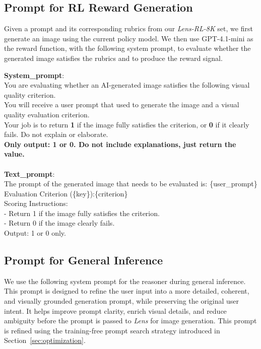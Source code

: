 \subsection{Prompt for RL Reward Generation}
\label{sec:prompt-reward}
Given a prompt and its corresponding rubrics from our \textit{Lens-RL-8K} set, we first generate an image using the current policy model. We then use GPT-4.1-mini as the reward function, with the following system prompt, to evaluate whether the generated image satisfies the rubrics and to produce the reward signal.


\begin{tcolorbox}[
  breakable,
  enhanced,
  colback=white,
  colframe=black!70,
  boxrule=0.8pt,
  arc=2pt,
  title={Prompt for RL Reward Generation},
  colbacktitle=black!75,
  coltitle=white,
  fonttitle=\bfseries,
  left=8pt,right=8pt,top=8pt,bottom=8pt
]
\footnotesize
\textbf{System\_prompt}: \\
\indent You are evaluating whether an AI-generated image satisfies the following visual quality criterion.\\
\indent You will receive a user prompt that used to generate the image and a visual quality evaluation criterion.\\
\indent Your job is to return \textbf{1} if the image fully satisfies the criterion, or \textbf{0} if it clearly fails. Do not explain or elaborate.\\
\indent \textbf{Only output: 1 or 0. Do not include explanations, just return the value.}\\
\\
\textbf{Text\_prompt}:\\
\indent The prompt of the generated image that needs to be evaluated is: \{user\_prompt\}\\
\indent Evaluation Criterion (\{key\}):\{criterion\}\\
\indent Scoring Instructions:\\
\indent - Return 1 if the image fully satisfies the criterion.\\
\indent - Return 0 if the image clearly fails.\\
\indent Output: 1 or 0 only.
\end{tcolorbox}


\subsection{Prompt for General Inference}
\label{sec:prompt-general}
We use the following system prompt for the reasoner during general inference. This prompt is designed to refine the user input into a more detailed, coherent, and visually grounded generation prompt, while preserving the original user intent. It helps improve prompt clarity, enrich visual details, and reduce ambiguity before the prompt is passed to \textit{Lens} for image generation. This prompt is refined using the training-free prompt search strategy introduced in Section~\ref{sec:optimization}.


